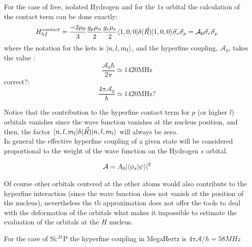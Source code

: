 For the case of free, isolated Hydrogen and for the $1s$ orbital the calculation of the contact term can be done exactly:
\begin{equation}
H^{contact}_{hf} =
\frac{-2\mu_0}{3}\frac{g_{p}\mu_{n}}{2}
\frac{g_{e}\mu_{e}}{2} \langle1,0,0|\delta(\vec{R})
|1,0,0\rangle  \vec{\sigma}_e\vec{\sigma}_p =
\mathcal{A}_{0}\vec{\sigma}_e\vec{\sigma}_p
\end{equation}
where the notation for the kets is $|n,l,m_{l}\rangle$, and the hyperfine
coupling, $\mathcal{A}_{0}$, takes the value : %
\begin{equation}
\frac{\mathcal{A}_{0}\hbar}{2\pi} \simeq 1420 \text{MHz}
\end{equation}
correct?:
\begin{equation}
\frac{4\pi\mathcal{A}_{0}}{\hbar} \simeq 1420 \text{MHz?}
\end{equation}

Notice that the contribution to the hyperfine contact term for $p$ (or higher $l$) orbitals vanishes since the wave function vanishes at the nucleus position, and then, the factor $\langle n,l,m_{l}|\delta(\vec{R})|n,l,m_{l}\rangle$ will always be zero.\\

In general the effective hyperfine coupling of a given state will be considered proportional to the weight of the wave function on the Hydrogen $s$ orbital.

\begin{equation}
  \mathcal{A} = A_0|\langle\phi_s|\psi\rangle|^2
\end{equation}

Of course other orbitals centered at the other atoms would also contribute to the hyperfine interaction (since the wave function does not vanish at the position of the nucleus), nevertheless the \ac{tb} approximation does not offer the tools to deal with the deformation of the orbitals what makes it impossible to estimate the evaluation of the orbitals at the $H$ nucleus.

For the case of Si:$^{31}$P the hyperfine coupling in MegaHertz is $4\pi\mathcal{A}/\hbar=58MHz$


